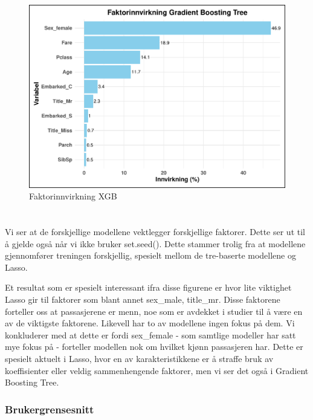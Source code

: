 \documentclass[
]{article}
\begin{document}
\begin{figure}[H]

{\centering \includegraphics[width=0.8\linewidth]{presentation_files/figure-latex/unnamed-chunk-12-1} 

}

\caption{Faktorinnvirkning XGB}\label{fig:unnamed-chunk-12}
\end{figure}

\section{}\label{section}

Vi ser at de forskjellige modellene vektlegger forskjellige faktorer.
Dette ser ut til å gjelde også når vi ikke bruker set.seed(). Dette
stammer trolig fra at modellene gjennomfører treningen forskjellig,
spesielt mellom de tre-baserte modellene og Lasso.

Et resultat som er spesielt interessant ifra disse figurene er hvor lite
viktighet Lasso gir til faktorer som blant annet sex\_male, title\_mr.
Disse faktorene forteller oss at passasjerene er menn, noe som er
avdekket i studier til å være en av de viktigste faktorene. Likevell har
to av modellene ingen fokus på dem. Vi konkluderer med at dette er fordi
sex\_female - som samtlige modeller har satt mye fokus på - forteller
modellen nok om hvilket kjønn passasjeren har. Dette er spesielt aktuelt
i Lasso, hvor en av karakteristikkene er å straffe bruk av koeffisienter
eller veldig sammenhengende faktorer, men vi ser det også i Gradient
Boosting Tree.

\subsubsection{Brukergrensesnitt}\label{brukergrensesnitt}
\end{document}
